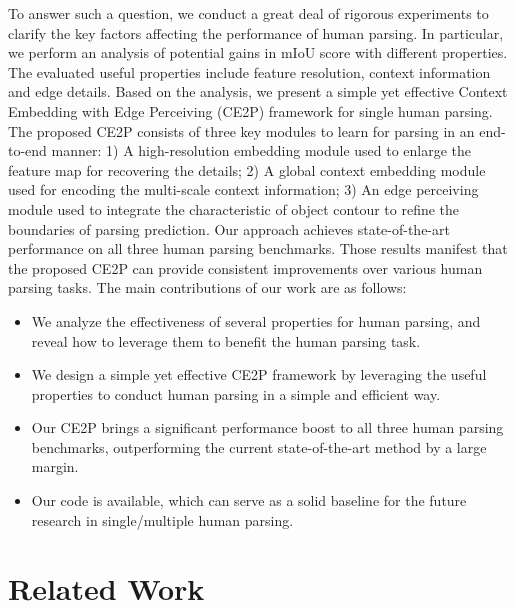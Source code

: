 \documentclass[letterpaper]{article} \usepackage{formatting-instructions-latex-2019}  \usepackage{times}  \usepackage{helvet}  \usepackage{courier}  \usepackage{url}  \usepackage{graphicx}  \frenchspacing  \setlength{\pdfpagewidth}{8.5in}  \setlength{\pdfpageheight}{11in}
\begin{document}
To answer such a question, we conduct a great deal of rigorous experiments to clarify the key factors affecting the performance of human parsing. In particular, we perform an analysis of potential gains in mIoU score with different properties. The evaluated useful properties include feature resolution, context information and edge details. Based on the analysis, we present a simple yet effective Context Embedding with Edge Perceiving (CE2P) framework for single human parsing. The proposed CE2P consists of three key modules to learn for parsing in an end-to-end manner: 1) A high-resolution embedding module used to enlarge the feature map for recovering the details; 2) A global context embedding module used for encoding the multi-scale context information; 3) An edge perceiving module used to integrate the characteristic of object contour to refine the boundaries of parsing prediction. Our approach achieves state-of-the-art performance on all three human parsing benchmarks. Those results manifest that the proposed CE2P can provide consistent improvements over various human parsing tasks. The main contributions of our work are as follows:

\begin{itemize}

\item We analyze the effectiveness of several properties for human parsing, and reveal how to leverage them to benefit the human parsing task.

\item We design a simple yet effective CE2P framework by leveraging the useful properties to conduct human parsing in a simple and efficient way. 

\item Our CE2P brings a significant performance boost to all three human parsing benchmarks, outperforming the current state-of-the-art method by a large margin. 

\item Our code is available, which can serve as a solid baseline for the future research in single/multiple human parsing.

\end{itemize}
  

 
\section{Related Work}
\end{document}
